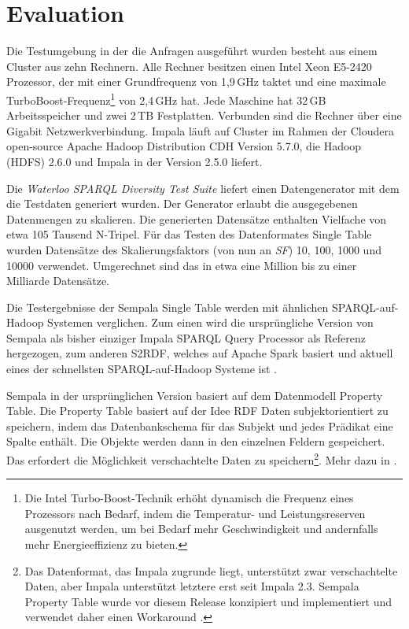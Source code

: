 \documentclass[
  a4paper,
  12pt,
  oneside,
  parskip=half,
  headsepline,
]{scrartcl}
\begin{document}
\section{Evaluation}
\label{sec:eval}

Die Testumgebung in der die Anfragen ausgeführt wurden besteht aus einem Cluster
aus zehn Rechnern. Alle Rechner besitzen einen Intel Xeon E5-2420 Prozessor, der
mit einer Grundfrequenz von 1,9\,GHz taktet und eine maximale
TurboBoost-Frequenz\footnote{Die Intel Turbo-Boost-Technik erhöht dynamisch die
Frequenz eines Prozessors nach Bedarf, indem die Temperatur- und
Leistungsreserven ausgenutzt werden, um bei Bedarf mehr Geschwindigkeit und
andernfalls mehr Energieeffizienz zu bieten. } von 2,4\,GHz hat. Jede Maschine
hat 32\,GB Arbeitsspeicher und zwei 2\,TB Festplatten. Verbunden sind die
Rechner über eine Gigabit Netzwerkverbindung. Impala läuft auf Cluster im Rahmen
der Cloudera open-source Apache Hadoop Distribution CDH Version 5.7.0, die
Hadoop (HDFS) 2.6.0 und  Impala in der Version 2.5.0 liefert.

Die \textit{Waterloo SPARQL Diversity Test Suite} liefert einen Datengenerator
mit dem die Testdaten generiert wurden. Der Generator erlaubt die
ausgegebenen Datenmengen zu skalieren. Die generierten Datensätze enthalten
Vielfache von etwa 105 Tausend N-Tripel. Für das Testen des Datenformates
Single Table wurden Datensätze des Skalierungsfaktors (von nun an \textit{SF})
10, 100, 1000 und 10000 verwendet. Umgerechnet sind das in etwa eine Million bis
zu einer Milliarde Datensätze.

Die Testergebnisse der Sempala Single Table werden mit ähnlichen
SPARQL-auf-Hadoop Systemen verglichen. Zum einen wird die ursprüngliche Version
von Sempala als bisher einziger Impala SPARQL Query Processor als Referenz
hergezogen, zum anderen S2RDF, welches auf Apache Spark basiert und aktuell
eines der schnellsten SPARQL-auf-Hadoop Systeme ist \cite{s2rdf}.

Sempala in der ursprünglichen Version basiert auf dem Datenmodell Property Table.
Die Property Table basiert auf der Idee RDF Daten subjektorientiert zu speichern,
indem das Datenbankschema für das Subjekt und jedes Prädikat eine Spalte enthält.
Die Objekte werden dann in den einzelnen Feldern gespeichert. Das erfordert die
Möglichkeit verschachtelte Daten zu speichern\footnote{Das Datenformat, das
Impala zugrunde liegt, unterstützt zwar verschachtelte Daten, aber Impala
unterstützt letztere erst seit Impala 2.3. Sempala Property Table wurde vor
diesem Release konzipiert und implementiert und verwendet daher einen Workaround
\cite{sempala}.}. Mehr dazu in \cite{sempala}.
\end{document}
